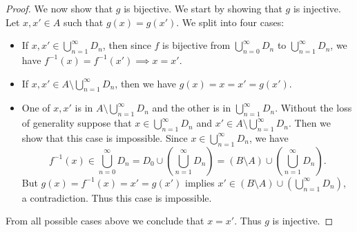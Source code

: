 \begin{proof}
    We now show that \(g\) is bijective.
    We start by showing that \(g\) is injective.
    Let \(x, x' \in A\) such that \(g(x) = g(x')\).
    We split into four cases:
    \begin{itemize}
        \item If \(x, x' \in \bigcup_{n = 1}^\infty D_n\), then since \(f\) is bijective from \(\bigcup_{n = 0}^\infty D_n\) to \(\bigcup_{n = 1}^\infty D_n\), we have \(f^{-1}(x) = f^{-1}(x') \implies x = x'\).
        \item If \(x, x' \in A \setminus \bigcup_{n = 1}^\infty D_n\), then we have \(g(x) = x = x' = g(x')\).
        \item One of \(x, x'\) is in \(A \setminus \bigcup_{n = 1}^\infty D_n\) and the other is in \(\bigcup_{n = 1}^\infty D_n\).
              Without the loss of generality suppose that \(x \in \bigcup_{n = 1}^\infty D_n\) and \(x' \in A \setminus \bigcup_{n = 1}^\infty D_n\).
              Then we show that this case is impossible.
              Since \(x \in \bigcup_{n = 1}^\infty D_n\), we have
              \[
                  f^{-1}(x) \in \bigcup_{n = 0}^\infty D_n = D_0 \cup (\bigcup_{n = 1}^\infty D_n) = (B \setminus A) \cup (\bigcup_{n = 1}^\infty D_n).
              \]
              But \(g(x) = f^{-1}(x) = x' = g(x')\) implies \(x' \in (B \setminus A) \cup (\bigcup_{n = 1}^\infty D_n)\), a contradiction.
              Thus this case is impossible.
    \end{itemize}
    From all possible cases above we conclude that \(x = x'\).
    Thus \(g\) is injective.


\end{proof}
